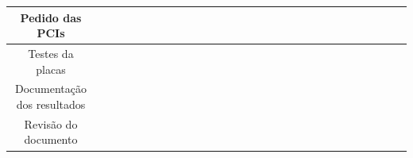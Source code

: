 \begin{table}[h!]
{\begin{tabular}{|c|cccc|cccc|cccc|cccc|cccc|cccc|cccc|}
Pedido das PCIs               &  &                          &                          &                          &                          &                          &                          &                          &                          &                          &                          &                          &                          & \cellcolor[HTML]{3166FF} &                          &                          &                          &                          &                          & \cellcolor[HTML]{3166FF} &                          &                          &                          &                          &                          &  &  &  \\ \hline
Testes da placas              &  &                          &                          &                          &                          &                          &                          &                          &                          &                          &                          &                          &                          &                          &                          &                          & \cellcolor[HTML]{3166FF} & \cellcolor[HTML]{3166FF} &                          &                          &                          &                          & \cellcolor[HTML]{3166FF} &                          &                          &  &  &  \\ \hline
Documentação dos resultados   &  &                          &                          & \cellcolor[HTML]{3166FF} &                          & \cellcolor[HTML]{3166FF} &                          &                          &                          & \cellcolor[HTML]{3166FF} & \cellcolor[HTML]{3166FF} & \cellcolor[HTML]{3166FF} &                          &                          & \cellcolor[HTML]{3166FF} & \cellcolor[HTML]{3166FF} &                          &                          &                          &                          & \cellcolor[HTML]{3166FF} & \cellcolor[HTML]{3166FF} &                          & \cellcolor[HTML]{3166FF} &                          &  &  &  \\ \hline
Revisão do documento          &  &                          &                          &                          &                          &                          &                          &                          &                          &                          &                          &                          &                          &                          &                          &                          &                          &                          &                          &                          &                          &                          &                          & \cellcolor[HTML]{3166FF} &                          &  &  &  \\ \hline

\end{tabular}}
\end{table}
